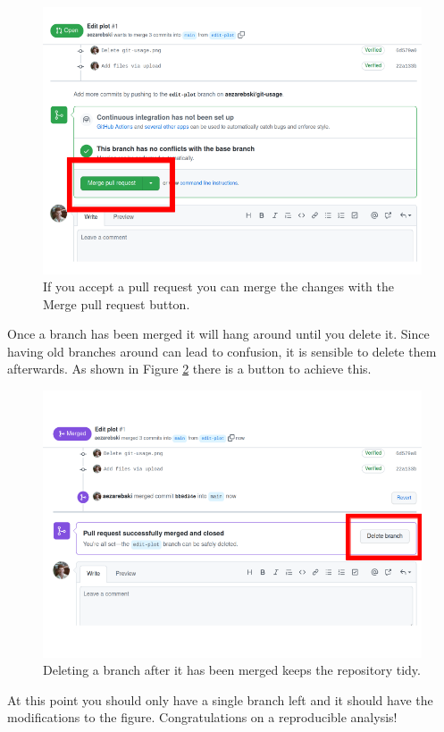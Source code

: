 \documentclass[11pt,onecolumn]{scrartcl}
\begin{document}
\begin{figure}[htbp]
\centering
\includegraphics[width=.9\linewidth]{./merge-pull-request.png}
\caption{\label{fig:merge-pull-request}If you accept a pull request you can merge the changes with the Merge pull request button.}
\end{figure}

Once a branch has been merged it will hang around until you delete it. Since
having old branches around can lead to confusion, it is sensible to delete them
afterwards. As shown in Figure \ref{fig:delete-branch} there is a button to achieve
this.

\begin{figure}[htbp]
\centering
\includegraphics[width=.9\linewidth]{./delete-branch.png}
\caption{\label{fig:delete-branch}Deleting a branch after it has been merged keeps the repository tidy.}
\end{figure}

At this point you should only have a single branch left and it should have the
modifications to the figure. Congratulations on a reproducible analysis!
\end{document}
